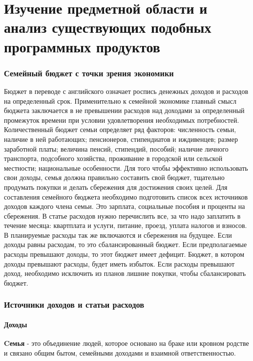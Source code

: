 \part{Изучение предметной области и анализ существующих подобных программных продуктов}

\section{Семейный бюджет с точки зрения экономики}

Бюджет в переводе с английского означает роспись денежных доходов и
расходов на определенный срок. Применительно к семейной экономике главный смысл бюджета заключается в не превышении расходов над доходами
за определенный промежуток времени при условии удовлетворения необходимых потребностей.
Количественный бюджет семьи определяет ряд факторов: численность
семьи, наличие в ней работающих; пенсионеров, стипендиатов и иждивенцев; размер заработной платы; величина пенсий, стипендий, пособий; наличие личного транспорта, подсобного хозяйства, проживание в городской или
сельской местности; национальные особенности.
Для того чтобы эффективно использовать свои доходы, семья должна правильно составить свой бюджет, тщательно продумать покупки и делать сбережения для достижения своих целей. Для составления семейного бюджета
необходимо подготовить список всех источников доходов каждого члена семьи. Это зарплата, социальные пособия и проценты на сбережения. В статье
расходов нужно перечислить все, за что надо заплатить в течение месяца:
квартплата и услуги, питание, проезд, уплата налогов и взносов. В планируемые расходы так же включаются и сбережения на будущее.
Если доходы равны расходам, то это сбалансированный бюджет. Если
предполагаемые расходы превышают доходы, то этот бюджет имеет дефицит. Бюджет, в котором доходы превышают расходы, будет иметь избыток.
Если расходы превышают доход, необходимо исключить из планов лишние
покупки, чтобы сбалансировать бюджет.

\section{Источники доходов и статьи расходов}

\subsection{Доходы}

\textbf{Cемья} - это объединение людей, которое основано на браке или кровном родстве и связано общим бытом, семейными доходами и взаимной ответственностью.

